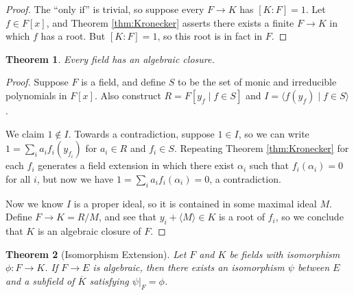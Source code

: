 \documentclass[
    parskip=half,
    toc=flat,
    toc=sectionentrydotfill,
]{scrartcl}  %
\theoremstyle{definition}
\theoremstyle{plain}
\newtheorem{theorem}{Theorem}[section]
\theoremstyle{remark}
\begin{document}
\begin{proof}
    The ``only if'' is trivial, so suppose every $F\to K$ has $[K:F]=1$.
    Let $f\in F[x]$, and Theorem \ref{thm:Kronecker} asserts there exists a finite $F\to K$ in which $f$ has a root.
    But $[K:F]=1$, so this root is in fact in $F$.
\end{proof}

\begin{theorem}
    Every field has an algebraic closure.
\end{theorem}

\begin{proof}
    Suppose $F$ is a field, and define $S$ to be the set of monic and irreducible polynomials in $F[x]$.
    Also construct $R=F[y_f\mid f\in S]$ and $I=\langle f(y_f)\mid f\in S\rangle$.

    We claim $1\notin I$.
    Towards a contradiction, suppose $1\in I$, so we can write $1=\sum_ia_if_i(y_{f_i})$ for $a_i\in R$ and $f_i\in S$.
    Repeating Theorem \ref{thm:Kronecker} for each $f_i$ generates a field extension in which there exist $\alpha_i$
    such that $f_i(\alpha_i)=0$ for all $i$, but now we have $1=\sum_ia_if_i(\alpha_i)=0$, a contradiction.

    Now we know $I$ is a proper ideal, so it is contained in some maximal ideal $M$.
    Define $F\to K=R/M$, and see that $y_i+\langle M\rangle\in K$ is a root of $f_i$, so we conclude that $K$ is an
    algebraic closure of $F$.
\end{proof}

\begin{theorem}[Isomorphism Extension]
    \label{thm:Isomorphism Extension}
    Let $F$ and $K$ be fields with isomorphism $\phi:F\to K$.
    If $F\to E$ is algebraic, then there exists an isomorphism $\psi$ between $E$ and a subfield of $\overline{K}$
    satisfying $\psi\vert_F=\phi$.
\end{theorem}
\end{document}
